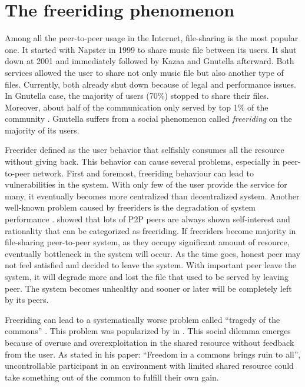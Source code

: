 \section{The freeriding phenomenon}
Among all the peer-to-peer usage in the Internet, file-sharing is the most popular one. It started with Napster in 1999 to share music file between its users. It shut down at 2001 and immediately followed by Kazaa and Gnutella afterward. Both services allowed the user to share not only music file but also another type of files. Currently, both already shut down because of legal and performance issues. In Gnutella case, the majority of users (70\%) stopped to share their files. Moreover, about half of the communication only served by top 1\% of the community \cite{2000:freeridegnutella:adar}. Gnutella suffers from a social phenomenon called \textit{freeriding} on the majority of its users.

Freerider defined as the user behavior that selfishly consumes all the resource without giving back. This behavior can cause several problems, especially in peer-to-peer network. First and foremost, freeriding behaviour can lead to vulnerabilities in the system. With only few of the user provide the service for many, it eventually becomes more centralized than decentralized system. Another well-known problem caused by freeriders is the degradation of system performance \cite{2000:freeridegnutella:adar}. \citeauthor{2000:freeridegnutella:adar} showed that lots of P2P peers are always shown self-interest and rationality that can be categorized as freeriding. If freeriders become majority in file-sharing peer-to-peer system, as they occupy significant amount of resource, eventually bottleneck in the system will occur. As the time goes, honest peer may not feel satisfied and decided to leave the system. With important peer leave the system, it will degrade more and lost the file that used to be served by leaving peer. The system becomes unhealthy and sooner or later will be completely left by its peers.

Freeriding can lead to a systematically worse problem called ``tragedy of the commons'' \cite{1968:tragedycommon:hardin}. This problem was popularized by \citet*{1968:tragedycommon:hardin} in \citeyear{1968:tragedycommon:hardin}. This social dilemma emerges because of overuse and overexploitation in the shared resource without feedback from the user. As \citeauthor{1968:tragedycommon:hardin} stated in his paper: ``Freedom in a commons brings ruin to all'', uncontrollable participant in an environment with limited shared resource could take something out of the common to fulfill their own gain.

